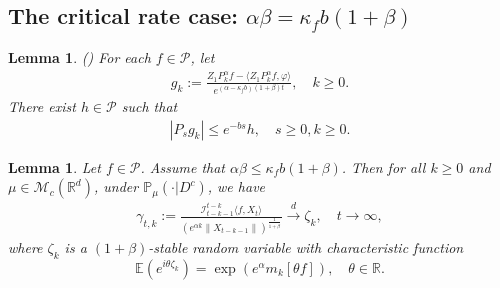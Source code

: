 \documentclass[12pt,a4paper]{amsart}
\theoremstyle{plain}
\newtheorem{lem}[thm]{Lemma}
\theoremstyle{definition}
\numberwithin{equation}{section}
\begin{document}
\subsection{The critical rate case: $\alpha\beta=\kappa_fb(1+\beta)$}
\begin{lem}\label{lem: control of gk}(\cite[Lemma 2.8]{MM})
    For each $f\in \mathcal{P}$, let
    \begin{align}
        g_k
    := \frac{Z_1 P^{\alpha}_k f-\langle  Z_1P^{\alpha}_k f,\varphi\rangle}{e^{(\alpha-\kappa_f b)(1+\beta)t}},
    \quad k \geq 0.
    \end{align}
    There exist $h\in \mathcal{P}$ such that
    \begin{align}
        |P_sg_k|\leq e^{-bs}h,\quad s\geq 0, k \geq 0.
    \end{align}
\end{lem}
\begin{lem}\label{lem: mainlemma}
Let $f\in \mathcal{P}$.
Assume that $\alpha\beta\leq \kappa_fb(1+\beta)$.
Then for all $k\geq 0$ and $\mu \in \mathcal M_c(\mathbb R^d)$, under $\mathbb{P}_{\mu}(\cdot | D ^c)$, we have
 \begin{equation}\begin{split}
      \gamma_{t,k}:=\frac{\mathcal I_{t-k-1}^{t-k}\langle f ,X_t\rangle}{(e^{\alpha k}\|X_{t-k-1}\|)^{\frac{1}{1+\beta}}}\xrightarrow{d}\zeta_k, \quad t\rightarrow \infty, \label{limitdistribution1}
 \end{split}\end{equation}
 where $\zeta_k$ is a $(1+\beta)$-stable random variable with characteristic function
 $$\mathbb{E}(e^{i\theta\zeta_k})=\exp(e^{\alpha}m_k[\theta f]),\quad \theta \in \mathbb R.$$
 \end{lem}
\end{document}

